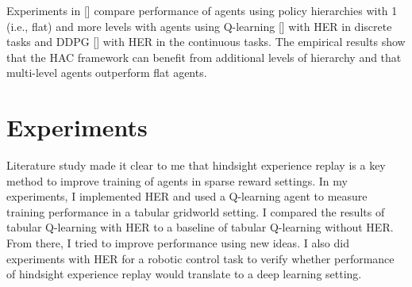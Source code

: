 \documentclass[conference]{IEEEtran}
\begin{document}
Experiments in [\cite{levy2019learning}] compare performance of agents using policy hierarchies with 1 (i.e., flat) and more levels with agents using Q-learning [\cite{watkins1992q}] with HER in discrete tasks and DDPG [\cite{lillicrap2015continuous}] with HER in the continuous tasks. The empirical results show that the HAC framework can benefit from additional levels of hierarchy and that multi-level agents outperform flat agents.

\section{Experiments} \label{sec:experiments}
Literature study made it clear to me that hindsight experience replay is a key method to improve training of agents in sparse reward settings. In my experiments, I implemented HER and used a Q-learning agent to measure training performance in a tabular gridworld setting. I compared the results of tabular Q-learning with HER to a baseline of tabular Q-learning without HER. From there, I tried to improve performance using new ideas. I also did experiments with HER for a robotic control task to verify whether performance of hindsight experience replay would translate to a deep learning setting.
\end{document}
